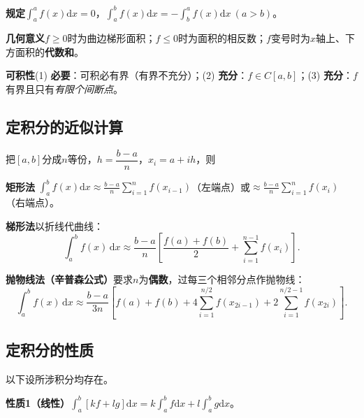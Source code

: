 
\noindent\textbf{规定}\quad $\displaystyle\int_a^af(x)\mathrm{d}x=0$，$\displaystyle\int_a^bf(x)\mathrm{d}x=-\int_b^af(x)\mathrm{d}x\ (a>b)$。

\noindent\textbf{几何意义}\quad $f\ge0$时为曲边梯形面积；$f\le0$时为面积的相反数；$f$变号时为$x$轴上、下方面积的\textbf{代数和}。

\noindent\textbf{可积性}\quad (1) \textbf{必要}：可积必有界（有界不充分）；(2) \textbf{充分}：$f\in C[a,b]$；(3) \textbf{充分}：$f$有界且只有\emph{有限个间断点}。


\subsection{定积分的近似计算}

把$[a,b]$分成$n$等份，$h=\dfrac{b-a}{n}$，$x_i=a+ih$，则

\noindent\textbf{矩形法}\quad
$\displaystyle\int_a^bf(x)\mathrm{d}x\approx\frac{b-a}{n}\sum_{i=1}^{n}f(x_{i-1})$（左端点）或$\displaystyle\approx\frac{b-a}{n}\sum_{i=1}^{n}f(x_i)$（右端点）。

\noindent\textbf{梯形法}\quad 以折线代曲线：
\[
\int_a^bf(x)\,\mathrm{d}x\approx\frac{b-a}{n}\left[\frac{f(a)+f(b)}{2}+\sum_{i=1}^{n-1}f(x_i)\right].
\]

\noindent\textbf{抛物线法（辛普森公式）}\quad 要求$n$为\textbf{偶数}，过每三个相邻分点作抛物线：
\[
\int_a^bf(x)\,\mathrm{d}x\approx\frac{b-a}{3n}\left[f(a)+f(b)+4\!\!\sum_{i=1}^{n/2}f(x_{2i-1})+2\!\!\sum_{i=1}^{n/2-1}f(x_{2i})\right].
\]


\subsection{定积分的性质}

以下设所涉积分均存在。

\noindent\textbf{性质1（线性）}\quad $\displaystyle\int_a^b[kf+lg]\mathrm{d}x=k\int_a^bf\mathrm{d}x+l\int_a^bg\mathrm{d}x$。

